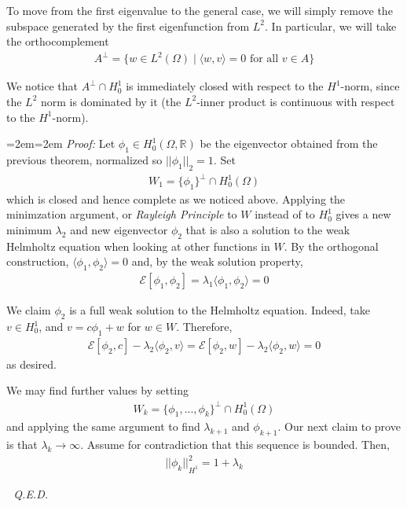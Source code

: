\documentclass{article}
\newcommand{\R}{{\mathbb{R}}}
\newcommand{ \norm }[1]{{ || {#1}||}}
\newenvironment{pf}{%
	\par%
	\medskip
	\leftskip=2em\rightskip=2em%
	\noindent\ignorespaces \textit{Proof:} \newline}{%
	\,\, \newline \textit{Q.E.D.}\par\medskip}
\begin{document}
	To move from the first eigenvalue to the general case, we will simply remove the subspace generated by the first eigenfunction from $L^{2}$. In particular, we will take the orthocomplement
	\begin{align*}
		A^{\perp} = \{w \in L^{2}(\Omega) \mid \langle w,v\rangle  = 0 \text{ for all }v \in A\}
	\end{align*}
	
	We notice that $A^{\perp} \cap H^{1}_{0}$ is immediately closed with respect to the $H^{1}$-norm, since the $L^{2}$ norm is dominated by it (the $L^{2}$-inner product is continuous with respect to the $H^{1}$-norm). 
	
	\begin{pf}
		[Proof of Spectral Theorem] Let $\phi_{1} \in H^{1}_{0}(\Omega, \R)$ be the eigenvector obtained from the previous theorem, normalized so $\norm{\phi_{1}}_{2} = 1$. Set
		\begin{align*}
			W_{1} = \{\phi_1\}^{\perp} \cap H^{1}_{0}(\Omega)
		\end{align*}
		which is closed and hence complete as we noticed above. Applying the minimzation argument, or \textit{Rayleigh Principle} to $W$ instead of to $H^{1}_{0}$ gives a new minimum $\lambda_2$ and new eigenvector $\phi_{2}$ that is also a solution to the weak Helmholtz equation when looking at other functions in $W$. By the orthogonal construction, $\langle \phi_1,\phi_2\rangle =0$ and, by the weak solution property,
		\begin{align*}
			\mathcal{E}[\phi_1,\phi_2] = \lambda_1 \langle \phi_1,\phi_2\rangle =0
		\end{align*}
		
		We claim $\phi_2$ is a full weak solution to the Helmholtz equation. Indeed, take $v \in H^{1}_{0}$, and $v = c \phi_1 + w$ for $w \in W$. Therefore, 
		\begin{align*}
			\mathcal{E}[\phi_2,c] - \lambda_2 \langle \phi_2,v\rangle  = \mathcal{E}[\phi_2,w] - \lambda_2 \langle \phi_2,w\rangle  = 0
		\end{align*}
		as desired. 
		
		\vspace{1cm}
		
		We may find further values by setting 
		\begin{align*}
			W_{k} = \{\phi_1,...,\phi_{k}\}^{\perp} \cap H^{1}_{0}(\Omega)
		\end{align*}
		and applying the same argument to find $\lambda_{k+1}$ and $\phi_{k+1}$. Our next claim to prove is that $\lambda_{k}\to \infty$. Assume for contradiction that this sequence is bounded. Then,
		\begin{align*}
			\norm{\phi_{k}}_{H^{1}}^{2} = 1+\lambda_k
		\end{align*}
		

\end{pf}
\end{document}
